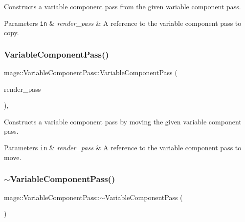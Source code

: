 Constructs a variable component pass from the given variable component pass.


\begin{DoxyParams}[1]{Parameters}
\mbox{\tt in}  & {\em render\+\_\+pass} & A reference to the variable component pass to copy. \\
\hline
\end{DoxyParams}
\hypertarget{classmage_1_1_variable_component_pass_a3e6d3187fb5e17d592915a22407c44be}{}\label{classmage_1_1_variable_component_pass_a3e6d3187fb5e17d592915a22407c44be} 
\subsubsection{\texorpdfstring{Variable\+Component\+Pass()}{VariableComponentPass()}\hspace{0.1cm}{\footnotesize\ttfamily [3/3]}}
{\footnotesize\ttfamily mage\+::\+Variable\+Component\+Pass\+::\+Variable\+Component\+Pass (\begin{DoxyParamCaption}\item[{\hyperlink{classmage_1_1_variable_component_pass}{Variable\+Component\+Pass} \&\&}]{render\+\_\+pass }\end{DoxyParamCaption})\hspace{0.3cm}{\ttfamily [default]}, {\ttfamily [noexcept]}}

Constructs a variable component pass by moving the given variable component pass.


\begin{DoxyParams}[1]{Parameters}
\mbox{\tt in}  & {\em render\+\_\+pass} & A reference to the variable component pass to move. \\
\hline
\end{DoxyParams}
\hypertarget{classmage_1_1_variable_component_pass_addf03c307a88e6a1871f0ec3adbb8bcb}{}\label{classmage_1_1_variable_component_pass_addf03c307a88e6a1871f0ec3adbb8bcb} 
\subsubsection{\texorpdfstring{$\sim$\+Variable\+Component\+Pass()}{~VariableComponentPass()}}
{\footnotesize\ttfamily mage\+::\+Variable\+Component\+Pass\+::$\sim$\+Variable\+Component\+Pass (\begin{DoxyParamCaption}{ }\end{DoxyParamCaption})\hspace{0.3cm}{\ttfamily [default]}}

